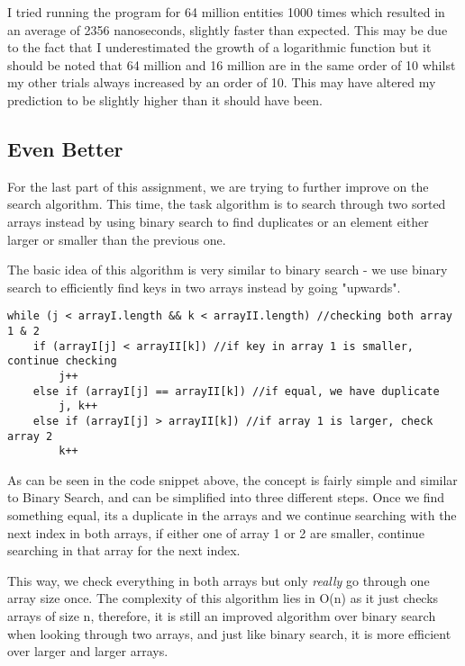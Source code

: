 \documentclass[a4paper,11pt]{article}
\begin{document}
I tried running the program for 64 million entities 1000 times which resulted in an average of 2356 nanoseconds, slightly faster than expected. This may be due to the fact that I underestimated the growth of a logarithmic function but it should be noted that 64 million and 16 million are in the same order of 10 whilst my other trials always increased by an order of 10. This may have altered my prediction to be slightly higher than it should have been.

\subsection*{Even Better}

For the last part of this assignment, we are trying to further improve on the search algorithm. This time, the task algorithm is to search through two sorted arrays instead by using binary search to find duplicates or an element either larger or smaller than the previous one.

The basic idea of this algorithm is very similar to binary search - we use binary search to efficiently find keys in two arrays instead by going "upwards".

\begin{verbatim}
while (j < arrayI.length && k < arrayII.length) //checking both array 1 & 2
    if (arrayI[j] < arrayII[k]) //if key in array 1 is smaller, continue checking
        j++
    else if (arrayI[j] == arrayII[k]) //if equal, we have duplicate
        j, k++
    else if (arrayI[j] > arrayII[k]) //if array 1 is larger, check array 2
        k++
\end{verbatim}

As can be seen in the code snippet above, the concept is fairly simple and similar to Binary Search, and can be simplified into three different steps. Once we find something equal, its a duplicate in the arrays and we continue searching with the next index in both arrays, if either one of array 1 or 2 are smaller, continue searching in that array for the next index.

This way, we check everything in both arrays but only {\em really} go through one array size once. The complexity of this algorithm lies in O(n) as it just checks arrays of size n, therefore, it is still an improved algorithm over binary search when looking through two arrays, and just like binary search, it is more efficient over larger and larger arrays.
\end{document}
